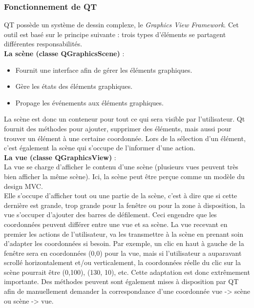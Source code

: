 \documentclass[french]{article}
\begin{document}
			\subsubsection{Fonctionnement de QT}
				QT possède un système de dessin complexe, le \textit{Graphics View Framework}. Cet outil est basé sur le principe suivante : trois types d'éléments se partagent différentes responsabilités. \\
				
				\noindent \textbf{La scène (classe QGraphicsScene)} :
				\begin{itemize}
					\item Fournit une interface afin de gérer les éléments graphiques.
					\item Gère les états des éléments graphiques.
					\item Propage les événements aux éléments graphiques.
				\end{itemize}
				
				La scène est donc un conteneur pour tout ce qui sera visible par l'utilisateur. Qt fournit des méthodes pour ajouter, supprimer des éléments, mais aussi pour trouver un élément à une certaine coordonnée. Lors de la sélection d'un élément, c'est également la scène qui s'occupe de l'informer d'une action. \\
				
				\noindent \textbf{La vue (classe QGraphicsView)} : \\
				La vue se charge d'afficher le contenu d'une scène (plusieurs vues peuvent très bien afficher la même scène). Ici, la scène peut être perçue comme un modèle du design MVC. \\
				Elle s'occupe d'afficher tout ou une partie de la scène, c'est à dire que si cette dernière est grande, trop grande pour la fenêtre ou pour la zone à disposition, la vue s'occuper d'ajouter des barres de défilement. Ceci engendre que les coordonnées peuvent différer entre une vue et sa scène. La vue recevant en premier les actions de l'utilisateur, va les transmettre à la scène en prenant soin d'adapter les coordonnées si besoin. Par exemple, un clic en haut à gauche de la fenêtre sera en coordonnées (0,0) pour la vue, mais si l'utilisateur a auparavant scrollé horizontalement et/ou verticalement, la coordonnées réelle du clic sur la scène pourrait être (0,100), (130, 10), etc. Cette adaptation est donc extrêmement importante. Des méthodes peuvent sont également mises à disposition par QT afin de manuellement demander la correspondance d'une coordonnée vue -> scène ou scène -> vue. \\
				
\end{document}
